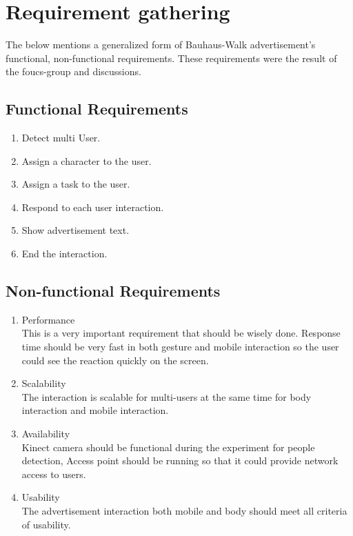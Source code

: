 \section{Requirement gathering}
The below mentions a generalized form of Bauhaus-Walk advertisement's functional, non-functional requirements. These requirements were the result of the foucs-group and discussions.

\subsection{Functional Requirements}

\begin{enumerate}
\item	Detect multi User.
\item	Assign a character to the user. 
\item	Assign a task to the user.
\item	Respond to each user interaction.
\item	Show advertisement text.
\item	End the interaction.
\end{enumerate}


\subsection{Non-functional Requirements}

\begin{enumerate}
\item	Performance \\
This is a very important requirement that should be wisely done. Response time should be very fast in both gesture and mobile interaction so the user could see the reaction quickly on the screen. 

\item	Scalability \\
The interaction is scalable for multi-users at the same time for body interaction and mobile interaction.

\item	Availability \\
Kinect camera should be functional during the experiment for people detection, Access point should be running so that it could provide network access to users.

\item	Usability \\
The advertisement interaction both mobile and body should meet all criteria of usability.
\end{enumerate}

